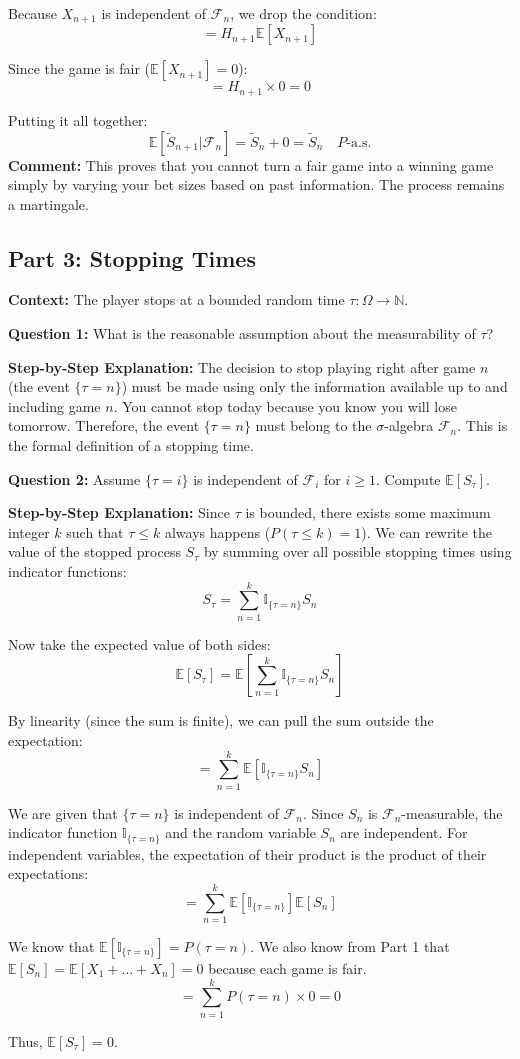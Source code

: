 Because $X_{n+1}$ is independent of $\mathcal{F}_n$, we drop the condition:
\[ = H_{n+1} \mathbb{E}[X_{n+1}] \]

Since the game is fair ($\mathbb{E}[X_{n+1}] = 0$):
\[ = H_{n+1} \times 0 = 0 \]

Putting it all together:
\[ \mathbb{E}[\tilde{S}_{n+1} | \mathcal{F}_n] = \tilde{S}_n + 0 = \tilde{S}_n \quad P\text{-a.s.} \]
\textbf{Comment:} This proves that you cannot turn a fair game into a winning game simply by varying your bet sizes based on past information. The process remains a martingale.

\subsection{Part 3: Stopping Times}

\textbf{Context:} The player stops at a bounded random time $\tau : \Omega \rightarrow \mathbb{N}$.

\textbf{Question 1:} What is the reasonable assumption about the measurability of $\tau$?

\textbf{Step-by-Step Explanation:}
The decision to stop playing right after game $n$ (the event $\{\tau = n\}$) must be made using only the information available up to and including game $n$. You cannot stop today because you know you will lose tomorrow. Therefore, the event $\{\tau = n\}$ must belong to the $\sigma$-algebra $\mathcal{F}_n$. This is the formal definition of a stopping time.

\vspace{0.5cm}
\textbf{Question 2:} Assume $\{\tau = i\}$ is independent of $\mathcal{F}_i$ for $i \ge 1$. Compute $\mathbb{E}[S_\tau]$.

\textbf{Step-by-Step Explanation:}
Since $\tau$ is bounded, there exists some maximum integer $k$ such that $\tau \le k$ always happens ($P(\tau \le k) = 1$). 
We can rewrite the value of the stopped process $S_\tau$ by summing over all possible stopping times using indicator functions:
\[ S_\tau = \sum_{n=1}^k \mathbb{I}_{\{\tau=n\}} S_n \]

Now take the expected value of both sides:
\[ \mathbb{E}[S_\tau] = \mathbb{E}\left[ \sum_{n=1}^k \mathbb{I}_{\{\tau=n\}} S_n \right] \]

By linearity (since the sum is finite), we can pull the sum outside the expectation:
\[ = \sum_{n=1}^k \mathbb{E}[\mathbb{I}_{\{\tau=n\}} S_n] \]

We are given that $\{\tau=n\}$ is independent of $\mathcal{F}_n$. Since $S_n$ is $\mathcal{F}_n$-measurable, the indicator function $\mathbb{I}_{\{\tau=n\}}$ and the random variable $S_n$ are independent. For independent variables, the expectation of their product is the product of their expectations:
\[ = \sum_{n=1}^k \mathbb{E}[\mathbb{I}_{\{\tau=n\}}] \mathbb{E}[S_n] \]

We know that $\mathbb{E}[\mathbb{I}_{\{\tau=n\}}] = P(\tau=n)$. We also know from Part 1 that $\mathbb{E}[S_n] = \mathbb{E}[X_1 + \dots + X_n] = 0$ because each game is fair.
\[ = \sum_{n=1}^k P(\tau=n) \times 0 = 0 \]

Thus, $\mathbb{E}[S_\tau] = 0$.